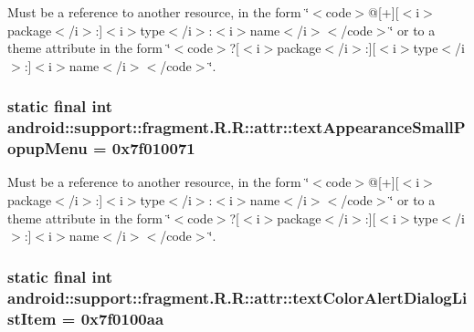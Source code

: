 Must be a reference to another resource, in the form \char`\"{}$<$code$>$@\mbox{[}+\mbox{]}\mbox{[}$<$i$>$package$<$/i$>$:\mbox{]}$<$i$>$type$<$/i$>$:$<$i$>$name$<$/i$>$$<$/code$>$\char`\"{} or to a theme attribute in the form \char`\"{}$<$code$>$?\mbox{[}$<$i$>$package$<$/i$>$:\mbox{]}\mbox{[}$<$i$>$type$<$/i$>$:\mbox{]}$<$i$>$name$<$/i$>$$<$/code$>$\char`\"{}. \hypertarget{classandroid_1_1support_1_1fragment_1_1_r_1_1attr_7c813c829e15924a46516336b845ad41}{
\subsubsection[{textAppearanceSmallPopupMenu}]{\setlength{\rightskip}{0pt plus 5cm}static final int android::support::fragment.R.R::attr::textAppearanceSmallPopupMenu = 0x7f010071}}
\label{classandroid_1_1support_1_1fragment_1_1_r_1_1attr_7c813c829e15924a46516336b845ad41}


Must be a reference to another resource, in the form \char`\"{}$<$code$>$@\mbox{[}+\mbox{]}\mbox{[}$<$i$>$package$<$/i$>$:\mbox{]}$<$i$>$type$<$/i$>$:$<$i$>$name$<$/i$>$$<$/code$>$\char`\"{} or to a theme attribute in the form \char`\"{}$<$code$>$?\mbox{[}$<$i$>$package$<$/i$>$:\mbox{]}\mbox{[}$<$i$>$type$<$/i$>$:\mbox{]}$<$i$>$name$<$/i$>$$<$/code$>$\char`\"{}. \hypertarget{classandroid_1_1support_1_1fragment_1_1_r_1_1attr_53cfd69cdf25074c01ef95584ad554d6}{
\subsubsection[{textColorAlertDialogListItem}]{\setlength{\rightskip}{0pt plus 5cm}static final int android::support::fragment.R.R::attr::textColorAlertDialogListItem = 0x7f0100aa}}
\label{classandroid_1_1support_1_1fragment_1_1_r_1_1attr_53cfd69cdf25074c01ef95584ad554d6}


